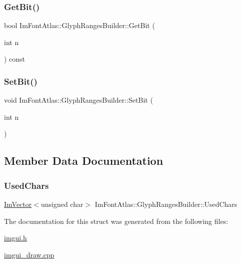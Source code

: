 \subsubsection{\texorpdfstring{Get\+Bit()}{GetBit()}}
{\footnotesize\ttfamily bool Im\+Font\+Atlas\+::\+Glyph\+Ranges\+Builder\+::\+Get\+Bit (\begin{DoxyParamCaption}\item[{int}]{n }\end{DoxyParamCaption}) const\hspace{0.3cm}{\ttfamily [inline]}}

\mbox{\label{struct_im_font_atlas_1_1_glyph_ranges_builder_aff570c016f17c1cd8d3a819b5f7a056c}} 
\subsubsection{\texorpdfstring{Set\+Bit()}{SetBit()}}
{\footnotesize\ttfamily void Im\+Font\+Atlas\+::\+Glyph\+Ranges\+Builder\+::\+Set\+Bit (\begin{DoxyParamCaption}\item[{int}]{n }\end{DoxyParamCaption})\hspace{0.3cm}{\ttfamily [inline]}}



\subsection{Member Data Documentation}
\mbox{\label{struct_im_font_atlas_1_1_glyph_ranges_builder_a369924c3fbeeac0402a6c02d62dd4a71}} 
\subsubsection{\texorpdfstring{Used\+Chars}{UsedChars}}
{\footnotesize\ttfamily \mbox{\hyperlink{class_im_vector}{Im\+Vector}}$<$unsigned char$>$ Im\+Font\+Atlas\+::\+Glyph\+Ranges\+Builder\+::\+Used\+Chars}



The documentation for this struct was generated from the following files\+:\begin{DoxyCompactItemize}
\item 
\mbox{\hyperlink{imgui_8h}{imgui.\+h}}\item 
\mbox{\hyperlink{imgui__draw_8cpp}{imgui\+\_\+draw.\+cpp}}\end{DoxyCompactItemize}

